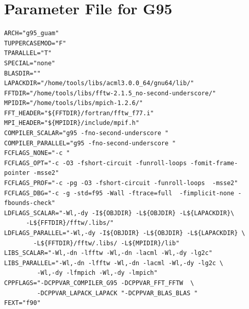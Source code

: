\documentclass[a4paper,10pt]{report}
\begin{document}
\section{Parameter File for G95}
\begin{verbatim}
ARCH="g95_guam"
TUPPERCASEMOD="F"
TPARALLEL="T"
SPECIAL="none"
BLASDIR=""
LAPACKDIR="/home/tools/libs/acml3.0.0_64/gnu64/lib/"
FFTDIR="/home/tools/libs/fftw-2.1.5_no-second-underscore/"
MPIDIR="/home/tools/libs/mpich-1.2.6/"
FFT_HEADER="${FFTDIR}/fortran/fftw_f77.i"
MPI_HEADER="${MPIDIR}/include/mpif.h"
COMPILER_SCALAR="g95 -fno-second-underscore "
COMPILER_PARALLEL="g95 -fno-second-underscore "
FCFLAGS_NONE="-c "
FCFLAGS_OPT="-c -O3 -fshort-circuit -funroll-loops -fomit-frame-pointer -msse2"
FCFLAGS_PROF="-c -pg -O3 -fshort-circuit -funroll-loops  -msse2"
FCFLAGS_DBG="-c -g -std=f95 -Wall -ftrace=full  -fimplicit-none -fbounds-check"
LDFLAGS_SCALAR="-Wl,-dy -I${OBJDIR} -L${OBJDIR} -L${LAPACKDIR}\
      -L${FFTDIR}/fftw/.libs/"
LDFLAGS_PARALLEL="-Wl,-dy -I${OBJDIR} -L${OBJDIR} -L${LAPACKDIR} \
        -L${FFTDIR}/fftw/.libs/ -L${MPIDIR}/lib"
LIBS_SCALAR="-Wl,-dn -lfftw -Wl,-dn -lacml -Wl,-dy -lg2c"
LIBS_PARALLEL="-Wl,-dn -lfftw -Wl,-dn -lacml -Wl,-dy -lg2c \
         -Wl,-dy -lfmpich -Wl,-dy -lmpich"
CPPFLAGS="-DCPPVAR_COMPILER_G95 -DCPPVAR_FFT_FFTW  \
         -DCPPVAR_LAPACK_LAPACK "-DCPPVAR_BLAS_BLAS "
FEXT="f90"
\end{verbatim}

\newpage
\end{document}
